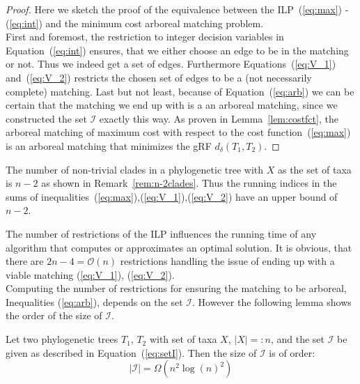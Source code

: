 \begin{proof}Here we sketch the proof of the equivalence between the ILP~(\ref{eq:max}) - (\ref{eq:int}) and the minimum cost arboreal matching problem.\\
First and foremost, the restriction to integer decision variables in Equation~(\ref{eq:int}) ensures, that we either choose an edge to be in the matching or not. Thus we indeed get a set of edges. Furthermore Equations~(\ref{eq:V_1}) and~(\ref{eq:V_2}) restricts the chosen set of edges to be a (not necessarily complete) matching. Last but not least, because of Equation~(\ref{eq:arb}) we can be certain that the matching we end up with is a an arboreal matching, since we constructed the set $\mathcal{I}$ exactly this way. As proven in Lemma~\ref{lem:costfct}, the arboreal matching of maximum cost with respect to the cost function~(\ref{eq:max}) is an arboreal matching that minimizes the gRF $d_{\delta}(T_1, T_2)$.
\end{proof}
\begin{rem}
The number of non-trivial clades in a phylogenetic tree with $X$ as the set of taxa is $n-2$ as shown in Remark~\ref{rem:n-2clades}. Thus the running indices in the sums of inequalities~(\ref{eq:max}),(\ref{eq:V_1}),(\ref{eq:V_2}) have an upper bound of $n-2$.\\
\end{rem}
The number of restrictions of the ILP influences the running time of any algorithm that computes or approximates an optimal solution. It is obvious, that there are $2n-4=\mathcal{O}(n)$ restrictions handling the issue of ending up with a viable matching (\ref{eq:V_1}), (\ref{eq:V_2}). \\
Computing the number of restrictions for ensuring the matching to be arboreal, Inequalities (\ref{eq:arb}), depends on the set $\mathcal{I}$. However the following lemma shows the order of the size of $\mathcal{I}$.
\begin{lem}\label{lem:numberOfRestrictions}
Let two phylogenetic trees $T_1$, $T_2$ with set of taxa $X$, $|X| =: n$, and the set $\mathcal{I}$ be given as described in Equation~(\ref{eq:setI}). Then the size of $\mathcal{I}$ is of order:
$$|\mathcal{I}| = \Omega(n^2 \log(n)^2)$$
\end{lem}
